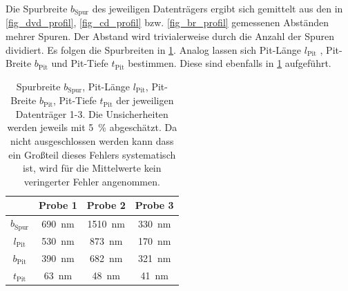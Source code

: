 \documentclass[
	a4paper,
	12pt,
	pagesize,
	ngerman
]{scrartcl}
\begin{document}
	Die Spurbreite $b_\text{Spur}$ des jeweiligen Datenträgers ergibt sich gemittelt aus den in \cref{fig_dvd_profil}, \cref{fig_cd_profil} bzw. \cref{fig_br_profil} gemessenen Abständen mehrer Spuren.
	Der Abstand wird trivialerweise durch die Anzahl der Spuren dividiert.
	Es folgen die Spurbreiten in \cref{tb_spur}.
	Analog lassen sich Pit-Länge $l_\text{Pit}$ , Pit-Breite $b_\text{Pit}$ und Pit-Tiefe $t_\text{Pit}$ bestimmen.
	Diese sind ebenfalls in \cref{tb_spur} aufgeführt.

\begin{table}[H]
		\centering
		\begin{tabular}{ c | c | c | c }
			 & Probe 1 & Probe 2 & Probe 3\\ \hline
			$b_\text{Spur}$ & \SI{690}{nm} & \SI{1510}{nm} &\SI{330}{nm} \\
			$l_\text{Pit}$ & \SI{530}{nm} & \SI{873}{nm} &\SI{170}{nm} \\
			$b_\text{Pit}$ & \SI{390}{nm} & \SI{682}{nm} &\SI{321}{nm} \\
			$t_\text{Pit}$ & \SI{63}{nm} & \SI{48}{nm} &\SI{41}{nm} \\
		\end{tabular}
		\caption{Spurbreite $b_\text{Spur}$, Pit-Länge $l_\text{Pit}$, Pit-Breite $b_\text{Pit}$, Pit-Tiefe $t_\text{Pit}$ der jeweiligen Datenträger 1-3.
		Die Unsicherheiten werden jeweils mit \SI{5}{\%} abgeschätzt.
		Da nicht ausgeschlossen werden kann dass ein Großteil dieses Fehlers systematisch ist, wird für die Mittelwerte kein veringerter Fehler angenommen.}
		\label{tb_spur}
	\end{table}

\end{document}
